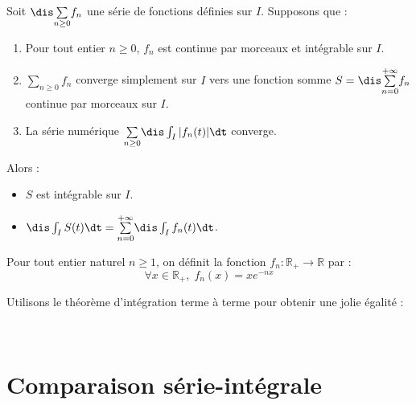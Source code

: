 \documentclass[a4paper,10pt]{report}
\newcommand{\Sum}[2]{\ensuremath{\textstyle{\sum\limits_{#1}^{#2}}}}
\begin{document}
\begin{thm}
Soit $\dis \Sum{n \geq 0}{} f_n$ une série de fonctions définies sur $I$. Supposons que :
\begin{enumerate}
\item Pour tout entier $n \geq 0$, $f_n$ est continue par morceaux et intégrable sur $I$.
\item $\Sum{n \geq 0}{} f_n$ converge simplement sur $I$ vers une fonction somme $S=\dis \Sum{n=0}{+\infty} f_n$ continue par morceaux sur $I$.
\item La série numérique $ \Sum{n \geq 0}{} \dis \int_{I} \vert f_n(t) \vert \dt$ converge.
\end{enumerate}
Alors :
\begin{itemize}
\item $S$ est intégrable sur $I$.
\item $\dis \int_{I} S(t) \dt =  \Sum{n=0}{+\infty} \dis \int_{I} f_n(t) \dt$.
\end{itemize}
\end{thm}

\begin{ex} Pour tout entier naturel $n \geq 1$, on définit la fonction $f_n : \mathbb{R}_+ \rightarrow \mathbb{R}$ par :
$$ \forall x \in \mathbb{R}_+, \; f_n(x)=xe^{-nx}$$

\noindent Utilisons le théorème d'intégration terme à terme pour obtenir une jolie égalité :
%

\vspace{10cm}
\end{ex}

\newpage

$\phantom{test}$

\vspace{3cm}
\section{Comparaison série-intégrale}
\end{document}
